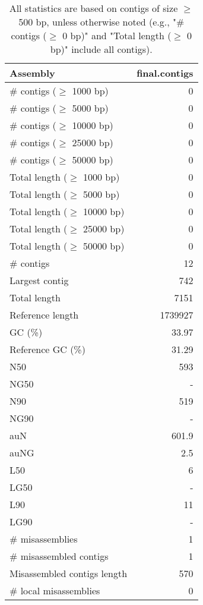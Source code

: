 \documentclass[12pt,a4paper]{article}
\begin{document}
\begin{table}[ht]
\begin{center}
\caption{All statistics are based on contigs of size $\geq$ 500 bp, unless otherwise noted (e.g., "\# contigs ($\geq$ 0 bp)" and "Total length ($\geq$ 0 bp)" include all contigs).}
\begin{tabular}{|l*{1}{|r}|}
\hline
Assembly & final.contigs \\ \hline
\# contigs ($\geq$ 1000 bp) & 0 \\ \hline
\# contigs ($\geq$ 5000 bp) & 0 \\ \hline
\# contigs ($\geq$ 10000 bp) & 0 \\ \hline
\# contigs ($\geq$ 25000 bp) & 0 \\ \hline
\# contigs ($\geq$ 50000 bp) & 0 \\ \hline
Total length ($\geq$ 1000 bp) & 0 \\ \hline
Total length ($\geq$ 5000 bp) & 0 \\ \hline
Total length ($\geq$ 10000 bp) & 0 \\ \hline
Total length ($\geq$ 25000 bp) & 0 \\ \hline
Total length ($\geq$ 50000 bp) & 0 \\ \hline
\# contigs & 12 \\ \hline
Largest contig & 742 \\ \hline
Total length & 7151 \\ \hline
Reference length & 1739927 \\ \hline
GC (\%) & 33.97 \\ \hline
Reference GC (\%) & 31.29 \\ \hline
N50 & 593 \\ \hline
NG50 & - \\ \hline
N90 & 519 \\ \hline
NG90 & - \\ \hline
auN & 601.9 \\ \hline
auNG & 2.5 \\ \hline
L50 & 6 \\ \hline
LG50 & - \\ \hline
L90 & 11 \\ \hline
LG90 & - \\ \hline
\# misassemblies & 1 \\ \hline
\# misassembled contigs & 1 \\ \hline
Misassembled contigs length & 570 \\ \hline
\# local misassemblies & 0 \\ \hline

\end{tabular}
\end{center}
\end{table}
\end{document}
